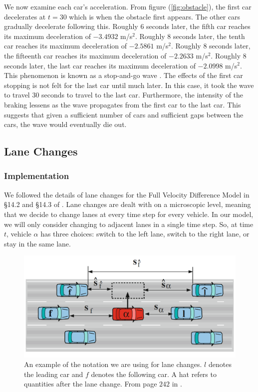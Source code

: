 \documentclass[12pt]{article}
\begin{document}
    We now examine each car's acceleration. From figure (\ref{fig:obstacle}), the first car decelerates at $t=30$ which is when the obstacle first appears. The other cars gradually decelerate following this. Roughly $6$ seconds later, the fifth car reaches its maximum deceleration of $-3.4932$ m/s$^2$. Roughly $8$ seconds later, the tenth car reaches its maximum deceleration of $-2.5861$ m/s$^2$. Roughly $8$ seconds later, the fifteenth car reaches its maximum deceleration of $-2.2633$ m/s$^2$. Roughly $8$ seconds later, the last car reaches its maximum deceleration of $-2.0998$ m/s$^2$. This phenomenon is known as a stop-and-go wave \cite{traffic}. The effects of the first car stopping is not felt for the last car until much later. In this case, it took the wave to travel $30$ seconds to travel to the last car. Furthermore, the intensity of the braking lessens as the wave propagates from the first car to the last car. This suggests that given a sufficient number of cars and sufficient gaps between the cars, the wave would eventually die out. 
    \subsection{Lane Changes}
    \subsubsection{Implementation}\label{sec:laneChangeImplementation}

    We followed the details of lane changes for the Full Velocity Difference Model in \S 14.2 and \S 14.3 of \cite{traffic}. Lane changes are dealt with on a microscopic level, meaning that we decide to change lanes at every time step for every vehicle.  In our model, we will only consider changing to adjacent lanes in a single time step. So, at time $t$, vehicle $\alpha$ has three choices: switch to the left lane, switch to the right lane, or stay in the same lane.

      \begin{figure}[H]
        \begin{center}
          \includegraphics{lane_change_diagram.PNG}
        \end{center}
        \caption{An example of the notation we are using for lane changes. $l$ denotes the leading car and $f$ denotes the following car. A hat refers to quantities after the lane change. From page $242$ in \cite{traffic}.}
      \end{figure}
\end{document}
